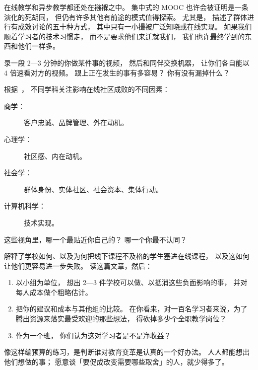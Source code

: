 在线教学和异步教学都还处在襁褓之中。
集中式的 MOOC 也许会被证明是一条演化的死胡同，
但仍有许多其他有前途的模式值得探索。
尤其是，
\cite{Broo2016}描述了群体进行有成效讨论的五十种方式，
其中只有一小撮被广泛知晓或在线实现。
如果我们顺着学习者的技术习惯走，
而不是要求他们来迁就我们，
我们也许最终学到的东西和他们一样多。



录一段 2—3 分钟的你做某件事的视频，
然后和同伴交换机器，
让你们各自能以 4 倍速看对方的视频。
跟上正在发生的事有多容易？
你有没有漏掉什么？


根据~\cite{Irib2009}，
不同学科关注影响在线社区成败的不同因素：

\begin{description}

\item[商学：]
  客户忠诚、品牌管理、外在动机。

\item[心理学：]
  社区感、内在动机。

\item[社会学：]
  群体身份、实体社区、社会资本、集体行动。

\item[计算机科学：]
  技术实现。

\end{description}

这些视角里，哪一个最贴近你自己的？
哪一个你最不认同？


解释了学校如何、以及为何把线下课程不及格的学生塞进在线课程，
以及这如何让他们更容易进一步失败。
读这篇文章，然后：

\begin{enumerate}

\item
  以小组为单位，
  想出 2—3 件学校可以做、以抵消这些负面影响的事，
  并对每人成本做个粗略估计。

\item
  把你的建议和成本与其他组的比较。
  在你看来，对一百名学习者来说，为了腾出资源来落实最受欢迎的那些想法，
  得砍掉多少个全职教学岗位？

\item
  作为一个班，
  你们认为这对学习者是不是净收益？

\end{enumerate}

像这样编预算的练习，是判断谁对教育变革是认真的一个好办法。
人人都能想出他们想做的事；
愿意谈「要促成改变需要哪些取舍」的人，就少得多了。
